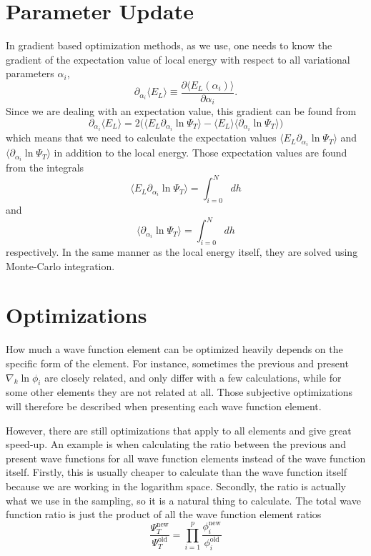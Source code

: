 \section{Parameter Update}
In gradient based optimization methods, as we use, one needs to know the gradient of the expectation value of local energy with respect to all variational parameters $\alpha_i$, 
\begin{equation}
\partial_{\alpha_i} \langle E_L\rangle\equiv\frac{\partial \langle E_L(\alpha_i)\rangle}{\partial \alpha_i}.
\end{equation}
Since we are dealing with an expectation value, this gradient can be found from
\begin{equation}
\partial_{\alpha_i} \langle E_L\rangle=2\Big(\langle E_L\partial_{\alpha_i}\ln\Psi_T\rangle - \langle E_L\rangle\langle\partial_{\alpha_i}\ln\Psi_T\rangle\Big)
\end{equation}
which means that we need to calculate the expectation values $\langle E_L\partial_{\alpha_i}\ln\Psi_T\rangle$ and $\langle\partial_{\alpha_i}\ln\Psi_T\rangle$ in addition to the local energy. Those expectation values are found from the integrals
\begin{equation}
\langle E_L\partial_{\alpha_i}\ln\Psi_T\rangle = \int_{i=0}^Ndh
\end{equation}
and
\begin{equation}
\langle\partial_{\alpha_i}\ln\Psi_T\rangle = \int_{i=0}^Ndh
\end{equation}
respectively. In the same manner as the local energy itself, they are solved using Monte-Carlo integration.

\section{Optimizations}
How much a wave function element can be optimized heavily depends on the specific form of the element. For instance, sometimes the previous and present $\nabla_k\ln\phi_i$ are closely related, and only differ with a few calculations, while for some other elements they are not related at all. Those subjective optimizations will therefore be described when presenting each wave function element. 

However, there are still optimizations that apply to all elements and give great speed-up. An example is when calculating the ratio between the previous and present wave functions
for all wave function elements instead of the wave function itself. Firstly, this is usually cheaper to calculate than the wave function itself because we are working in the logarithm space. Secondly, the ratio is actually what we use in the sampling, so it is a natural thing to calculate. The total wave function ratio is just the product of all the wave function element ratios
\begin{equation*}
	\frac{\Psi_T^{\text{new}}}{\Psi_T^{\text{old}}}=\prod_{i=1}^p\frac{\phi_i^{\text{new}}}{\phi_i^{\text{old}}}
\end{equation*}

